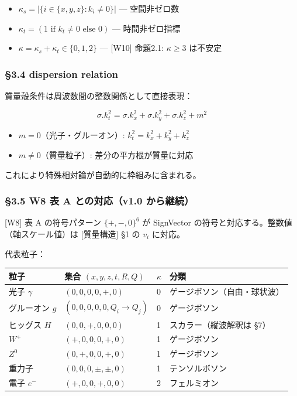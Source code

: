 \documentclass[a4paper,11pt]{ltjsarticle}
\providecommand{\tightlist}{\setlength{\itemsep}{0pt}\setlength{\parskip}{0pt}}
\newcounter{none}
\begin{document}
\begin{itemize}
\tightlist
\item
  \(\kappa_s = |\{i \in \{x,y,z\} : k_i \neq 0\}|\) --- 空間非ゼロ数
\item
  \(\kappa_t = (1 \text{ if } k_t \neq 0 \text{ else } 0)\) ---
  時間非ゼロ指標
\item
  \(\kappa = \kappa_s + \kappa_t \in \{0, 1, 2\}\) --- {[}W10{]}
  命題2.1: \(\kappa \geq 3\) は不安定
\end{itemize}

\subsubsection{§3.4 dispersion relation}\label{dispersion-relation}

質量殻条件は周波数間の整数関係として直接表現：

\[\sigma.k_t^2 = \sigma.k_x^2 + \sigma.k_y^2 + \sigma.k_z^2 + m^2\]

\begin{itemize}
\tightlist
\item
  \(m = 0\)（光子・グルーオン）: \(k_t^2 = k_x^2 + k_y^2 + k_z^2\)
\item
  \(m \neq 0\)（質量粒子）: 差分の平方根が質量に対応
\end{itemize}

これにより特殊相対論が自動的に枠組みに含まれる。

\subsubsection{§3.5 W8 表 A との対応（v1.0
から継続）}\label{w8-ux8868-a-ux3068ux306eux5bfeux5fdcv1.0-ux304bux3089ux7d99ux7d9a}

{[}W8{]} 表 A の符号パターン \(\{+, -, 0\}^6\) が SignVector
の符号と対応する。整数値（軸スケール値）は {[}質量構造{]} §1 の \(v_i\)
に対応。

代表粒子：

{\def\LTcaptype{none} %
\begin{longtable}[]{@{}llll@{}}
\toprule\noalign{}
粒子 & 集合 \((x,y,z,t,R,Q)\) & \(\kappa\) & 分類 \\
\midrule\noalign{}
\endhead
\bottomrule\noalign{}
\endlastfoot
光子 \(\gamma\) & \((0,0,0,0,+,0)\) & 0 &
ゲージボソン（自由・球状波） \\
グルーオン \(g\) & \((0,0,0,0,0,Q_i \to Q_j)\) & 0 & ゲージボソン \\
ヒッグス \(H\) & \((0,0,+,0,0,0)\) & 1 & スカラー（縦波解釈は §7） \\
\(W^+\) & \((+,0,0,0,+,0)\) & 1 & ゲージボソン \\
\(Z^0\) & \((0,+,0,0,+,0)\) & 1 & ゲージボソン \\
重力子 & \((0,0,0,\pm,\pm,0)\) & 1 & テンソルボソン \\
電子 \(e^-\) & \((+,0,0,+,0,0)\) & 2 & フェルミオン \\
\end{longtable}
}
\end{document}
